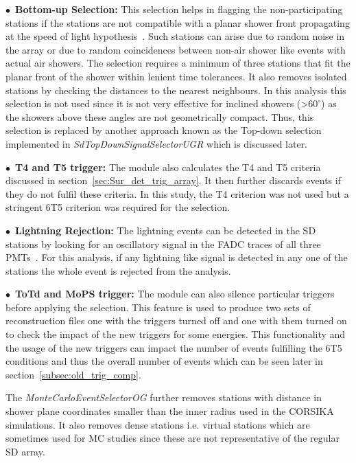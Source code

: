 \begin{description}
  \item $\bullet$~\textbf{Bottom-up Selection:} This selection helps in flagging the non-participating stations if the stations are not compatible with a planar shower front propagating at the speed of light hypothesis~\cite{gap_bottom_up}. Such stations can arise due to random noise in the array or due to random coincidences between non-air shower like events with actual air showers. The selection requires a minimum of three stations that fit the planar front of the shower within lenient time tolerances. It also removes isolated stations by checking the distances to the nearest neighbours. In this analysis this selection is not used since it is not very effective for inclined showers (>$60^{\circ}$) as the showers above these angles are not geometrically compact. Thus, this selection is replaced by another approach known as the Top-down selection implemented in \textit{SdTopDownSignalSelectorUGR} which is discussed later. 
  \item $\bullet$~\textbf{T4 and T5 trigger:} The module also calculates the T4 and T5 criteria discussed in section~\ref{sec:Sur_det_trig_array}. It then further discards events if they do not fulfil these criteria. In this study, the T4 criterion was not used but a stringent 6T5 criterion was required for the selection. 
  \item $\bullet$~\textbf{Lightning Rejection:} The lightning events can be detected in the SD stations by looking for an oscillatory signal in the FADC traces of all three PMTs~\cite{2017AGUFMAE31A..06C}. For this analysis, if any lightning like signal is detected in any one of the stations the whole event is rejected from the analysis. 
  \item $\bullet$~\textbf{ToTd and MoPS trigger:} The module can also silence particular triggers before applying the selection. This feature is used to produce two sets of reconstruction files one with the triggers turned off and one with them turned on to check the impact of the new triggers for some energies. This functionality and the usage of the new triggers can impact the number of events fulfilling the 6T5 conditions and thus the overall number of events which can be seen later in section~\ref{subsec:old_trig_comp}.    
\end{description}

The \textit{MonteCarloEventSelectorOG} further removes stations with distance in shower plane coordinates smaller than the inner radius used in the CORSIKA simulations. It also removes dense stations i.e. virtual stations which are sometimes used for MC studies since these are not representative of the regular SD array. 

